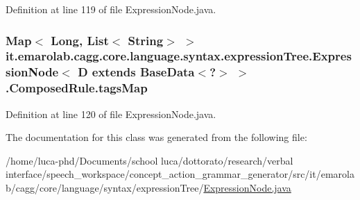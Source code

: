 Definition at line 119 of file Expression\-Node.\-java.

\hypertarget{classit_1_1emarolab_1_1cagg_1_1core_1_1language_1_1syntax_1_1expressionTree_1_1ExpressionNode_3_85122d0a00e50139778c858e32d721ce_a129357fc49da1f9870f54098f796bf93}{
\subsubsection[{tags\-Map}]{\setlength{\rightskip}{0pt plus 5cm}Map$<$ Long, List$<$ String$>$ $>$ it.\-emarolab.\-cagg.\-core.\-language.\-syntax.\-expression\-Tree.\-Expression\-Node$<$ D extends Base\-Data$<$?$>$ $>$.Composed\-Rule.\-tags\-Map\hspace{0.3cm}{\ttfamily [private]}}}\label{classit_1_1emarolab_1_1cagg_1_1core_1_1language_1_1syntax_1_1expressionTree_1_1ExpressionNode_3_85122d0a00e50139778c858e32d721ce_a129357fc49da1f9870f54098f796bf93}


Definition at line 120 of file Expression\-Node.\-java.



The documentation for this class was generated from the following file\-:\begin{DoxyCompactItemize}
\item 
/home/luca-\/phd/\-Documents/school luca/dottorato/research/verbal interface/speech\-\_\-workspace/concept\-\_\-action\-\_\-grammar\-\_\-generator/src/it/emarolab/cagg/core/language/syntax/expression\-Tree/\hyperlink{ExpressionNode_8java}{Expression\-Node.\-java}\end{DoxyCompactItemize}
